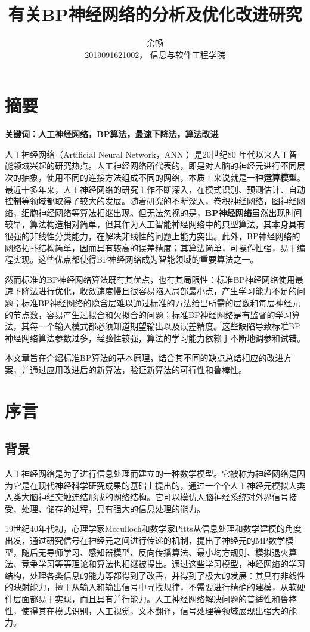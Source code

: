 \documentclass[UTF8]{ctexart}
\title{有关BP神经网络的分析及优化改进研究}
\author{余畅 \\ 2019091621002， 信息与软件工程学院}
\begin{document}
\maketitle

\section{摘要}
\textbf{关键词：人工神经网络，BP算法，最速下降法，算法改进} \par
人工神经网络（Artificial Neural Network，ANN ）是20世纪80 年代以来人工智能领域兴起的研究热点。人工神经网络所代表的，即是对人脑的神经元进行不同层次的抽象，使用不同的连接方法组成不同的网络，本质上来说就是一种\textbf{运算模型}。最近十多年来，人工神经网络的研究工作不断深入，在模式识别、预测估计、自动控制等领域都取得了较大的发展。随着研究的不断深入，卷积神经网络，图神经网络，细胞神经网络等算法相继出现。但无法忽视的是，\textbf{BP神经网络}虽然出现时间较早，算法构造相对简单，但其作为人工智能神经网络中的典型算法，其本身具有很强的非线性分类能力，在解决非线性的问题上能力突出。此外，BP神经网络的网络拓扑结构简单，因而具有较高的误差精度；其算法简单，可操作性强，易于编程实现。这些优点都使得BP神经网络成为智能领域的重要算法之一。 \par
然而标准的BP神经网络算法既有其优点，也有其局限性：标准BP神经网络使用最速下降法进行优化，收敛速度慢且很容易陷入局部最小点，产生学习能力不足的问题；标准BP神经网络的隐含层难以通过标准的方法给出所需的层数和每层神经元的节点数，容易产生过拟合和欠拟合的问题；标准BP神经网络是有监督的学习算法，其每一个输入模式都必须知道期望输出以及误差精度。这些缺陷导致标准BP神经网络算法参数过多，经验性较强，算法的学习能力依赖于不断地调参和试错。 \par
本文章旨在介绍标准BP算法的基本原理，结合其不同的缺点总结相应的改进方案，并通过应用改进后的新算法，验证新算法的可行性和鲁棒性。

\section{序言}
\subsection{背景}
人工神经网络是为了进行信息处理而建立的一种数学模型。它被称为神经网络是因为它是在现代神经科学研究成果的基础上提出的，通过一个个人工神经元模拟人类人类大脑神经突触连结形成的网络结构。它可以模仿人脑神经系统对外界信号接受、处理、储存的过程，具有强大的信息处理的能力。 \par
19世纪40年代初，心理学家Mcculloch和数学家Pitts从信息处理和数学建模的角度出发，通过研究信号在神经元之间进行传递的机制，提出了神经元的MP数学模型，随后无导师学习、感知器模型、反向传播算法、最小均方规则、模拟退火算法、竞争学习等等理论和算法也相继被提出。通过这些学习模型，神经网络的学习结构，处理各类信息的能力等都得到了改善，并得到了极大的发展：其具有非线性的映射能力，擅于从输入和输出信号中寻找规律，不需要进行精确的建模，从软硬件层面都易于实现，而且具有并行能力。人工神经网络解决问题的普适性和鲁棒性，使得其在模式识别，人工视觉，文本翻译，信号处理等领域展现出强大的能力。 \par
\end{document}
